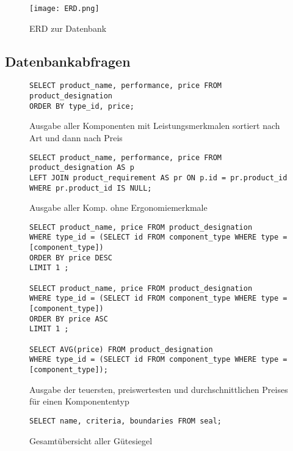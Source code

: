 \documentclass{article}
\begin{document}
\begin{figure}[htp]
\caption{ERD zur Datenbank}
\texttt{[image: ERD.png]}\par\vspace{1cm}
\end{figure}

\subsection{Datenbankabfragen}

\begin{figure}[!h]
\centering
\caption{
Ausgabe aller Komponenten mit Leistungsmerkmalen sortiert nach Art und dann nach Preis
}
\begin{lstlisting}
SELECT product_name, performance, price FROM product_designation
ORDER BY type_id, price;
\end{lstlisting}
\end{figure}
\begin{figure}[!h]
\centering
\caption{Ausgabe aller Komp. ohne Ergonomiemerkmale}
\begin{lstlisting}
SELECT product_name, performance, price FROM product_designation AS p
LEFT JOIN product_requirement AS pr ON p.id = pr.product_id
WHERE pr.product_id IS NULL;
\end{lstlisting}
\end{figure}
\begin{figure}[!h]
\centering
\caption{Ausgabe der teuersten, preiswertesten und durchschnittlichen Preises für einen Komponententyp}
\begin{lstlisting}
SELECT product_name, price FROM product_designation
WHERE type_id = (SELECT id FROM component_type WHERE type = [component_type])
ORDER BY price DESC 
LIMIT 1 ;

SELECT product_name, price FROM product_designation
WHERE type_id = (SELECT id FROM component_type WHERE type = [component_type])
ORDER BY price ASC 
LIMIT 1 ;

SELECT AVG(price) FROM product_designation
WHERE type_id = (SELECT id FROM component_type WHERE type = [component_type]);
\end{lstlisting}
\end{figure}
\begin{figure}[!h]
\centering

\caption{Gesamtübersicht aller Gütesiegel}
\begin{lstlisting}
SELECT name, criteria, boundaries FROM seal;
\end{lstlisting}
\end{figure}
\end{document}
